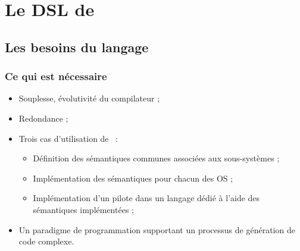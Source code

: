\documentclass[]{beamer}
\begin{document}
\section{Le DSL de \rtx}

\subsection{Les besoins du langage}
\begin{frame}
\frametitle{Ce qui est nécessaire}
\begin{itemize}[<+->]
    \item Souplesse, évolutivité du compilateur ;
    \item Redondance ;
    \item Trois cas d'utilisation de \rtx\ :
        \begin{itemize}
            \item Définition des sémantiques communes associées aux
                  sous-systèmes ;
            \item Implémentation des sémantiques pour chacun des OS ;
            \item Implémentation d'un pilote dans un langage dédié à l'aide des
                  sémantiques implémentées ;
        \end{itemize}
    \item Un paradigme de programmation supportant un processus de génération
          de code complexe.
\end{itemize}
\end{frame}
\end{document}
